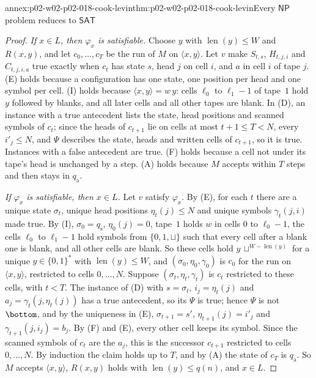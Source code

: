 \begin{annexitem}{annex:p02-w02-p02-018-cook-levin}{thm:p02-w02-p02-018-cook-levin}{Every \(\mathsf{NP}\) problem reduces to \(\mathsf{SAT}\)}
\begin{proof}
\emph{If \(x\in L\), then \(\varphi_x\) is satisfiable.}  Choose \(y\) with
\(\operatorname{len}(y)\leq W\) and \(R(x,y)\), and let \(c_0,\ldots,c_T\) be the run of
\(M\) on \(\langle x,y\rangle\).  Let \(v\) make \(S_{t,s}\), \(H_{t,j,i}\)
and \(C_{t,j,i,a}\) true exactly when \(c_t\) has state \(s\), head \(j\) on
cell \(i\), and \(a\) in cell \(i\) of tape \(j\).  (E) holds because a
configuration has one state, one position per head and one symbol per cell.
(I) holds because \(\langle x,y\rangle=w\,y\): cells \(\ell_0\) to
\(\ell_1-1\) of tape~\(1\) hold \(y\) followed by blanks, and all later cells
and all other tapes are blank.  In (D), an instance with a true antecedent
lists the state, head positions and scanned symbols of \(c_t\); since the heads
of \(c_{t+1}\) lie on cells at most \(t+1\leq T<N\), every \(i'_j\leq N\), and
\(\Psi\) describes the state, heads and written cells of \(c_{t+1}\), so it
is true.  Instances with a false antecedent are true.  (F) holds because a
cell not under its tape's head is unchanged by a step.  (A) holds because
\(M\) accepts within \(T\) steps and then stays in \(q_{\mathrm a}\).

\emph{If \(\varphi_x\) is satisfiable, then \(x\in L\).}  Let \(v\) satisfy
\(\varphi_x\).  By (E), for each \(t\) there are a unique state
\(\sigma_t\), unique head positions \(\eta_t(j)\leq N\) and unique symbols
\(\gamma_t(j,i)\) made true.  By (I), \(\sigma_0=q_{\mathrm s}\),
\(\eta_0(j)=0\), tape~\(1\) holds \(w\) in cells \(0\) to \(\ell_0-1\), the
cells \(\ell_0\) to \(\ell_1-1\) hold symbols from \(\{0,1,\sqcup\}\) such
that every cell after a blank one is blank, and all other cells are blank.
So these cells hold \(y\,\sqcup^{W-\operatorname{len}(y)}\) for a unique \(y\in\{0,1\}^*\)
with \(\operatorname{len}(y)\leq W\), and \((\sigma_0,\eta_0,\gamma_0)\) is \(c_0\) for the
run on \(\langle x,y\rangle\), restricted to cells \(0,\ldots,N\).
Suppose \((\sigma_t,\eta_t,\gamma_t)\) is \(c_t\) restricted to these cells,
with \(t<T\).  The instance of (D) with \(s=\sigma_t\),
\(i_j=\eta_t(j)\) and \(a_j=\gamma_t(j,\eta_t(j))\) has a true antecedent,
so its \(\Psi\) is true; hence \(\Psi\) is not \(\bottom\), and by the
uniqueness in (E), \(\sigma_{t+1}=s'\), \(\eta_{t+1}(j)=i'_j\) and
\(\gamma_{t+1}(j,i_j)=b_j\).  By (F) and (E), every other cell keeps its
symbol.  Since the scanned symbols of \(c_t\) are the \(a_j\), this is the
successor \(c_{t+1}\) restricted to cells \(0,\ldots,N\).  By induction the
claim holds up to \(T\), and by (A) the state of \(c_T\) is \(q_{\mathrm a}\).
So \(M\) accepts \(\langle x,y\rangle\), \(R(x,y)\) holds with
\(\operatorname{len}(y)\leq q(n)\), and \(x\in L\).


\end{proof}
\end{annexitem}
